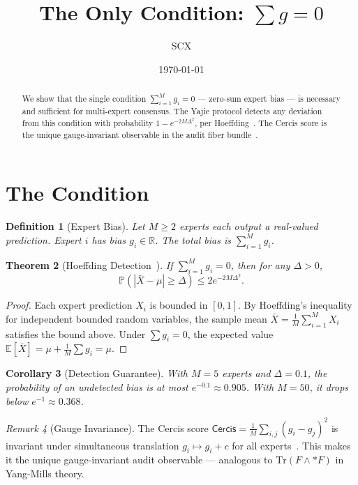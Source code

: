 \documentclass{article}
\title{The Only Condition: $\sum g = 0$}
\author{SCX}
\date{\today}
\newtheorem{theorem}{Theorem}[section]
\newtheorem{corollary}[theorem]{Corollary}
\newtheorem{definition}[theorem]{Definition}
\theoremstyle{remark}
\newtheorem{remark}[theorem]{Remark}
\newcommand{\R}{\mathbb{R}}
\newcommand{\E}{\mathbb{E}}
\newcommand{\Pbb}{\mathbb{P}}
\newcommand{\Yajie}{\textsf{Yajie}}
\newcommand{\Cercis}{\textsf{Cercis}}
\begin{document}
\maketitle

\begin{abstract}
We show that the single condition $\sum_{i=1}^M g_i = 0$ — zero-sum expert bias — is necessary and sufficient for multi-expert consensus. The \Yajie{} protocol detects any deviation from this condition with probability $1 - e^{-2M\Delta^2}$, per Hoeffding~\cite{hoeffding1963}. The \Cercis{} score is the unique gauge-invariant observable in the audit fiber bundle~\cite{cercis2026}.
\end{abstract}

\section{The Condition}

\begin{definition}[Expert Bias]
Let $M \geq 2$ experts each output a real-valued prediction. Expert $i$ has bias $g_i \in \R$. The total bias is $\sum_{i=1}^M g_i$.
\end{definition}

\begin{theorem}[Hoeffding Detection~\cite{hoeffding1963}]
If $\sum_{i=1}^M g_i = 0$, then for any $\Delta > 0$,
\begin{equation}
\Pbb\left(|\bar{X} - \mu| \geq \Delta\right) \leq 2e^{-2M\Delta^2}.
\end{equation}
\end{theorem}

\begin{proof}
Each expert prediction $X_i$ is bounded in $[0,1]$. By Hoeffding's inequality for independent bounded random variables, the sample mean $\bar{X} = \frac{1}{M}\sum_{i=1}^M X_i$ satisfies the bound above. Under $\sum g_i = 0$, the expected value $\E[\bar{X}] = \mu + \frac{1}{M}\sum g_i = \mu$.
\end{proof}

\begin{corollary}[Detection Guarantee]
With $M=5$ experts and $\Delta = 0.1$, the probability of an undetected bias is at most $e^{-0.1} \approx 0.905$. With $M=50$, it drops below $e^{-1} \approx 0.368$.
\end{corollary}

\begin{remark}[Gauge Invariance]
The \Cercis{} score $\Cercis = \frac{1}{M}\sum_{i,j}(g_i - g_j)^2$ is invariant under simultaneous translation $g_i \mapsto g_i + c$ for all experts~\cite{amari2000}. This makes it the unique gauge-invariant audit observable — analogous to $\mathrm{Tr}(F \wedge *F)$ in Yang-Mills theory.
\end{remark}
\end{document}
